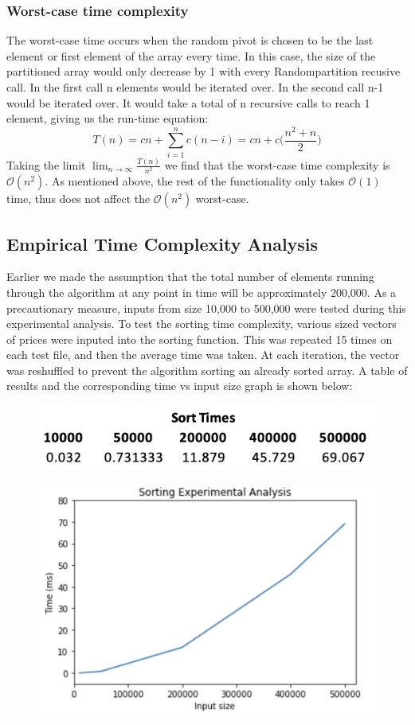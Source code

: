 \documentclass[11p]{article}
\begin{document}
\subsubsection{Worst-case time complexity}
The worst-case time occurs when the random pivot is chosen to be the last element or first element of the array every time. In this case, the size of the partitioned array would only decrease by 1 with every Randompartition recusive call. In the first call n elements would be iterated over. In the second call n-1 would be iterated over. It would take a total of n recursive calls to reach 1 element, giving us the run-time equation:
$$T(n) =  cn + \sum_{i=1}^n c(n-i) = cn + c\big( \frac{n^2 + n}{2}\big)$$
Taking the limit $\lim_{n\to \infty} \frac{T(n)}{n^2}$ we find that the worst-case time complexity is $\mathcal{O}(n^2)$. As mentioned above, the rest of the functionality only takes $\mathcal{O}(1)$ time, thus does not affect the $\mathcal{O}(n^2)$ worst-case.

\pagebreak

\subsection{Empirical Time Complexity Analysis}
Earlier we made the assumption that the total number of elements running through the algorithm at any point in time will be approximately 200,000. As a precautionary measure, inputs from size 10,000 to 500,000 were tested during this experimental analysis. To test the sorting time complexity, various sized vectors of prices were inputed into the sorting function. This was repeated 15 times on each test file, and then the average time was taken. At each iteration, the vector was reshuffled to prevent the algorithm sorting an already sorted array. A table of results and the corresponding time vs input size graph is shown below:

\begin{figure}[hbt!]
	\centering
	\includegraphics[width=0.4\linewidth]{experimental_results/sorttable.png}
\end{figure}

\begin{figure}[hbt!]
	\centering
	\includegraphics[width=0.4\linewidth]{experimental_results/sortGraph.png}
\end{figure}
\end{document}
